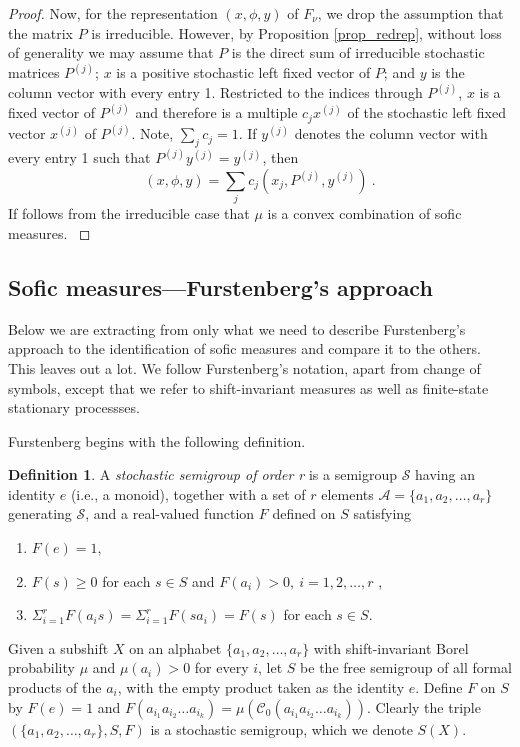 \documentclass{kepart2010}
\theoremstyle{plain}
\theoremstyle{definition}
\newtheorem{defn}[thm]{Definition}
\theoremstyle{remark}
\theoremstyle{definition}
\numberwithin{equation}{section}
\begin{document}
\begin{proof}
{}{ Now, for the representation $(x,\phi ,y)$ of $F_{\nu}$, we drop
the assumption that the matrix $P$ is irreducible. However, by
Proposition \ref{prop_redrep}, without loss of generality we may
assume that $P$ is the direct sum of irreducible stochastic matrices
$P^{(j)}$;  $x$ is a positive stochastic left fixed
 vector of $P$; and $y$ is the column vector
with every entry 1. Restricted to the indices through  $P^{(j)}$,
$x$ is a fixed vector of  $P^{(j)}$ and therefore is a multiple
$c_jx^{(j)}$ of the stochastic left fixed vector  $x^{(j)}$ of
$P^{(j)}$. Note, $\sum_jc_j=1$. If  $y^{(j)}$ denotes the column
vector with every entry 1 such that
 $P^{(j)}y^{(j)}=y^{(j)}$, then
\[
(x,\phi ,y ) = \sum_j c_j(x_j, P^{(j)}, y^{(j)}) \ .
\]
If follows from the irreducible case that $\mu$ is a convex
combination
of sofic measures.
}
 \end{proof}

\subsection{Sofic measures---Furstenberg's
approach}\label{sec_furst}

Below we are extracting from \cite[Secs. 18--19]{Furstenberg1960}
only what we need to describe Furstenberg's approach to the
identification of sofic measures and compare it to the others. This
leaves out a lot. We follow Furstenberg's notation, apart from
change of symbols, except that we refer to shift-invariant measures
as well as finite-state stationary processses.

Furstenberg begins with the following definition.

\begin{defn} \cite[Definition 18.1]{Furstenberg1960}
A {\it stochastic semigroup of order r} is a semigroup $\mathcal S$
having an identity $e$ (i.e., a monoid), together with a set of $r$
elements
  {${{\mathcal A}}=
\{ a_1, a_2, \dots , a_r\}$
 }
generating $\mathcal S$, and a real-valued function $F$ defined on
$S$ satisfying
\begin{enumerate}
\item
$F(e)=1$,
\item
$F(s )\geq 0$ for each $s \in S$ and $F(a_i) > 0, \ i=1,2,\dots ,r$
,
\item
$\Sigma_{i=1}^r F(a_is )= \Sigma_{i=1}^r F(s a_i)= F(s )$ for each
$s \in S$.
\end{enumerate}
\end{defn}

Given a subshift $X$ on an alphabet $\{a_1, a_2, \dots , a_r\}$ with
shift-invariant Borel probability $\mu $ and $\mu (a_i)>0$ for every
$i$,  let $S$ be the free semigroup of all formal products of the
$a_i$, with the empty product taken as the identity $e$. Define $F$
on $S$ by $F(e)=1$ and $F(a_{i_1}a_{i_2}\dots  a_{i_k})= \mu
({{\mathcal C}}_0(a_{i_1}a_{i_2}\dots   a_{i_k}))$. Clearly the triple $(\{a_1,
a_2, \dots , a_r\},S,F)$ is a stochastic semigroup, which we denote
$S(X)$.
\end{document}
